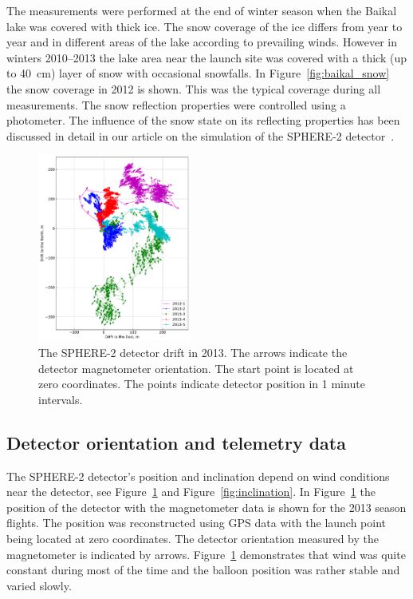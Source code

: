 \documentclass[universe,article,submit,moreauthors,pdftex]{Definitions/mdpi}
\begin{document}
The measurements were performed at the end of winter season when the Baikal lake was covered with thick ice. The snow coverage of the ice differs from year to year and in different areas of the lake according to prevailing winds. However in winters 2010--2013 the lake area near the launch site was covered with a thick (up to 40~cm) layer of snow with occasional snowfalls. In Figure~\ref{fig:baikal_snow} the snow coverage in 2012 is shown. This was the typical coverage during all measurements. The snow reflection properties were controlled using a photometer. The influence of the snow state on its reflecting properties has been discussed in detail in our article on the simulation of the SPHERE-2 detector~\cite{Ant19}.


\begin{figure}[tb]
    \includegraphics[width=0.45\textwidth]{figs/fig4_GPS_drift.pdf}\hspace{2pc}%
    \caption{The SPHERE-2 detector drift in 2013. The arrows indicate the detector magnetometer orientation. The start point is located at zero coordinates. The points indicate detector position in 1 minute intervals.}
\label{fig:gps_compass}
\end{figure}

 
\subsection{Detector orientation and telemetry data}
\label{sect:telemetrydata}

The \mbox{SPHERE-2} detector's position and inclination depend on wind conditions near the detector, see Figure~\ref{fig:gps_compass} and Figure~\ref{fig:inclination}. In Figure~\ref{fig:gps_compass} the position of the detector with the magnetometer data is shown for the 2013 season  flights. The position was reconstructed using GPS data with the launch point being located at zero coordinates. The detector orientation measured by the magnetometer is indicated by arrows. Figure~\ref{fig:gps_compass} demonstrates that wind was quite constant during most of the time and the balloon position was rather stable and varied slowly.  
\end{document}
